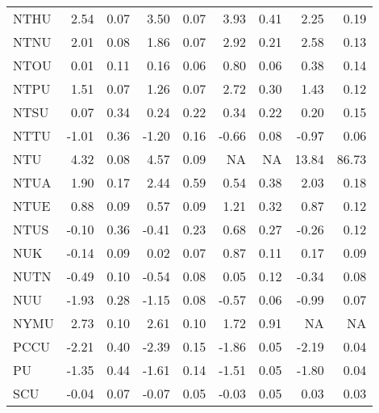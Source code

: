 \begin{longtable}[t]{lrrrrrrrr}
\hspace{1em}NTHU & 2.54 & 0.07 & 3.50 & 0.07 & 3.93 & 0.41 & 2.25 & 0.19\\
\hspace{1em}NTNU & 2.01 & 0.08 & 1.86 & 0.07 & 2.92 & 0.21 & 2.58 & 0.13\\
\hspace{1em}NTOU & 0.01 & 0.11 & 0.16 & 0.06 & 0.80 & 0.06 & 0.38 & 0.14\\
\hspace{1em}NTPU & 1.51 & 0.07 & 1.26 & 0.07 & 2.72 & 0.30 & 1.43 & 0.12\\
\hspace{1em}NTSU & 0.07 & 0.34 & 0.24 & 0.22 & 0.34 & 0.22 & 0.20 & 0.15\\
\hspace{1em}NTTU & -1.01 & 0.36 & -1.20 & 0.16 & -0.66 & 0.08 & -0.97 & 0.06\\
\hspace{1em}NTU & 4.32 & 0.08 & 4.57 & 0.09 & NA & NA & 13.84 & 86.73\\
\hspace{1em}NTUA & 1.90 & 0.17 & 2.44 & 0.59 & 0.54 & 0.38 & 2.03 & 0.18\\
\hspace{1em}NTUE & 0.88 & 0.09 & 0.57 & 0.09 & 1.21 & 0.32 & 0.87 & 0.12\\
\hspace{1em}NTUS & -0.10 & 0.36 & -0.41 & 0.23 & 0.68 & 0.27 & -0.26 & 0.12\\
\hspace{1em}NUK & -0.14 & 0.09 & 0.02 & 0.07 & 0.87 & 0.11 & 0.17 & 0.09\\
\hspace{1em}NUTN & -0.49 & 0.10 & -0.54 & 0.08 & 0.05 & 0.12 & -0.34 & 0.08\\
\hspace{1em}NUU & -1.93 & 0.28 & -1.15 & 0.08 & -0.57 & 0.06 & -0.99 & 0.07\\
\hspace{1em}NYMU & 2.73 & 0.10 & 2.61 & 0.10 & 1.72 & 0.91 & NA & NA\\
\hspace{1em}PCCU & -2.21 & 0.40 & -2.39 & 0.15 & -1.86 & 0.05 & -2.19 & 0.04\\
\hspace{1em}PU & -1.35 & 0.44 & -1.61 & 0.14 & -1.51 & 0.05 & -1.80 & 0.04\\
\hspace{1em}SCU & -0.04 & 0.07 & -0.07 & 0.05 & -0.03 & 0.05 & 0.03 & 0.03\\

\end{longtable}
